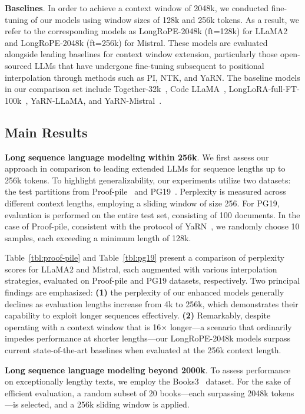 \textbf{Baselines}. In order to achieve a context window of 2048k, we conducted fine-tuning of our models using window sizes of 128k and 256k tokens. As a result, we refer to the corresponding models as LongRoPE-2048k (ft=128k) for LLaMA2 and LongRoPE-2048k (ft=256k) for Mistral. These models are evaluated alongside leading baselines for context window extension, particularly those open-sourced LLMs that have undergone fine-tuning subsequent to positional interpolation through methods such as PI, NTK, and YaRN. The baseline models in our comparison set include Together-32k~\cite{together}, Code LLaMA~\cite{codellama}, LongLoRA-full-FT-100k~\cite{longlora}, YaRN-LLaMA, and YaRN-Mistral~\cite{yarn}.

\subsection{Main Results}

\label{sec:mainresult}
\textbf{Long sequence language modeling within 256k}. We first assess our approach in comparison to leading extended LLMs for sequence lengths up to 256k tokens. To highlight generalizability, our experiments utilize two datasets: the test partitions from Proof-pile~\cite{pg19} and PG19~\cite{pile}. Perplexity is measured across different context lengths, employing a sliding window of size 256. For PG19, evaluation is performed on the entire test set, consisting of 100 documents. In the case of Proof-pile, consistent with the protocol of YaRN~\cite{yarn}, we randomly choose 10 samples, each exceeding a minimum length of 128k.

Table~\ref{tbl:proof-pile} and Table~\ref{tbl:pg19} present a comparison of perplexity scores for LLaMA2 and Mistral, each augmented with various interpolation strategies, evaluated on Proof-pile and PG19 datasets, respectively. Two principal findings are emphasized: \textbf{(1)} the perplexity of our enhanced models generally declines as evaluation lengths increase from 4k to 256k, which demonstrates their capability to exploit longer sequences effectively. \textbf{(2)} Remarkably, despite operating with a context window that is 16$\times$ longer—a scenario that ordinarily impedes performance at shorter lengths—our LongRoPE-2048k models surpass current state-of-the-art baselines when evaluated at the 256k context length.

\textbf{Long sequence language modeling beyond 2000k}. To assess performance on exceptionally lengthy texts, we employ the Books3~\cite{pile} dataset. For the sake of efficient evaluation, a random subset of 20 books—each surpassing 2048k tokens—is selected, and a 256k sliding window is applied.

